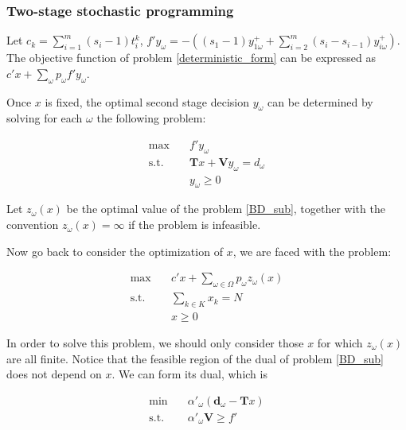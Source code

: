 \subsubsection{Two-stage stochastic programming}

Let $c_k = \sum_{i=1}^m (s_i-1)t_i^k$, $f{'}y_{\omega} = -\left((s_1-1)y_{1 \omega}^{+} + \sum_{i=2}^{m}(s_{i}-s_{i-1}) y_{i \omega}^{+}\right)$. The objective function of problem \eqref{deterministic_form} can be expressed as $c{'}x + \sum_{\omega} p_{\omega}f{'}y_{\omega}$.

Once $x$ is fixed, the optimal second stage decision $y_{\omega}$ can be determined by solving for each $\omega$ the following problem:

\begin{equation}\label{BD_sub}
\begin{aligned}
  \max \quad & f{'} y_{\omega} \\
  \text {s.t.} \quad & \mathbf{T}x + \mathbf{V} y_{\omega} = d_{\omega} \\
   & y_{\omega} \geq 0
\end{aligned}
\end{equation}


Let $z_{\omega}(x)$ be the optimal value of the problem \eqref{BD_sub}, together with the convention $z_{\omega}(x) = \infty$ if the problem is infeasible. 

Now go back to consider the optimization of $x$, we are faced with the problem:

\begin{equation}\label{BD_master}
  \begin{aligned}
    \max \quad & c{'} x + \sum_{\omega \in \Omega} p_{\omega} z_{\omega}(x) \\
    \text {s.t.} \quad & \sum_{k \in K} x_k = N \\
     & x \geq 0
  \end{aligned}
\end{equation}

In order to solve this problem, we should only consider those $x$ for which $z_{\omega}(x)$ are all finite. Notice that the feasible region of the dual of problem \eqref{BD_sub} does not depend on $x$. We can form its dual, which is 

\begin{equation}\label{BD_sub_dual}
  \begin{aligned}
    \min \quad & \alpha{'}_{\omega} (\mathbf{d}_{\omega}- \mathbf{T}x) \\
    \text {s.t.} \quad & \alpha{'}_{\omega} \mathbf{V} \geq f{'}
  \end{aligned}
  \end{equation}

